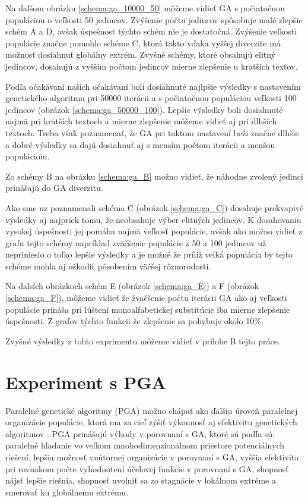 Na dalšom obrázku \ref{schema:ga_10000_50} môžeme vidieť GA s počiatočnou populáciou o veľkosti 50 jedincov. Zvýšenie počtu jedincov spôsobuje malé zlepšie  schém A a D, avšak úspešnosť týchto schém nie je dostatočná. Zvýšenie veľkosti populácie značne pomohlo schéme C, ktorá takto vďaka vyššej diverzite má možnosť dosiahnuť globálny extrém. Zvyšné schémy, ktoré obsahujú elitný jedincov, dosahujú z vyšším počtom jedincov mierne zlepšenie u kratších textov. 


Podľa očakávaní naších očakávaní boli dosiahnuté najlpšie výsledky s nastavením genetického algoritmu pri 50000 iterácii a s počiatočnou populáciou veľkosti 100 jedincov (obrázok \ref{schema:ga_50000_100}). Lepšie výsledky boli dosiahnuté najmä pri kratších textoch a mierne zlepšenie môžeme vidieť aj pri dlhších textoch. Treba však poznamenať, že GA pri taktom nastavení beži značne dlhšie a dobré výsledky sa dajú dosiahnuť aj s mensím počtom iterácii a menšou populácioiu. 


Zo schémy B na obrázku \ref{schema:ga_B} možno vidieť, že náhodne zvolený jedinci prinášajú do GA diverzitu.


Ako sme uz poznamenali schéma C (obrázok \ref{schema:ga_C}) dosahuje prekvapivé výsledky aj najpriek tomu, že neobsahuje výber elitných jedincov. K dosahovaniu vysokej úspešnosti jej pomáha najmä veľkosť populácie, avšak ako možno vidieť z grafu tejto schémy napríklad zväčšenie populácie z 50 a 100 jedincov už neprinieslo o toľko lepšie výsledky a je možné že príliž veľká populácia by tejto schéme mohla aj uškodiť pôsobením väčšej rôznorodosti.


Na dalsích obrázkoch schém E (obrázok \ref{schema:ga_E}) a F (obrázok \ref{schema:ga_F}), môžeme vidieť že žvačšenie počtu iterácii GA ako aj veľkosti populácie prináša pri lúštení monoalfabetickej substitúcie iba mierne zlepšenie úspešnosti. Z grafov týchto funkcii že zlepšenie sa pohybuje okolo 10\%.



Zvyšné výsledky z tohto exprimentu môžeme vidieť v prílohe B tejto práce.
\section{Experiment s PGA}
Paralelné genetické algoritmy (PGA) možno chápať ako ďalšiu úroveň paralelnej organizácie populácie, ktorá ma za cieľ zýšiť výkonnosť aj efektivitu genetických algoritmov \cite{pea}.
PGA prinášajú výhody v porovnaní s GA, ktoré sú podľa \cite{pea} sú: paralelné hladanie vo veľkom mnohodimenzionálnom priestore potenciálnych riešení, lepšia možnosť vnútornej organizácie v porovnaní s GA, vyššia efektivita pri rovnakom počte vyhodnotení účelovej funkcie v porovnaní s GA, shopnosť nájsť lepšie riešnia, shopnosť uvolniť sa zo stagnácie v lokálnom extréme a smerovať ku globálnemu extrému.

